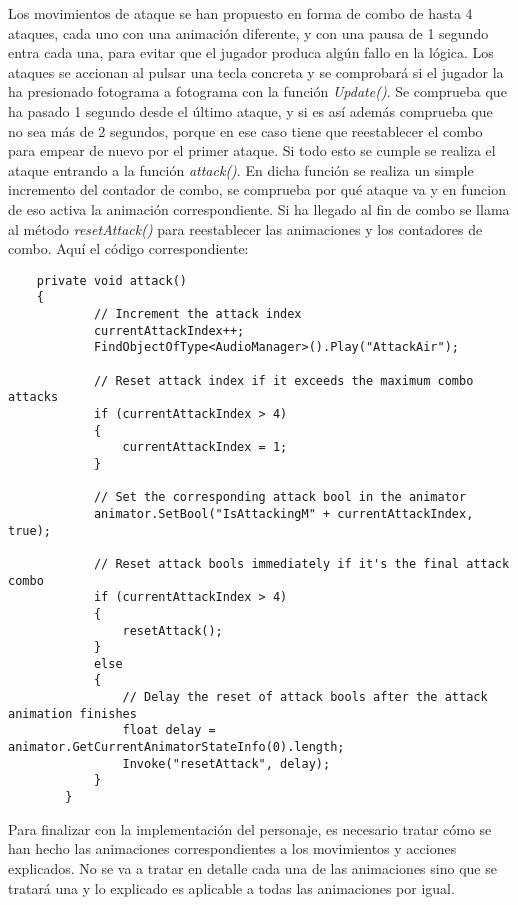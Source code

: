 Los movimientos de ataque se han propuesto en forma de combo de hasta 4 ataques, cada uno con una animación diferente, y con una pausa de 1 segundo entra cada una, para evitar que el jugador produca algún fallo en la lógica. Los ataques se accionan al pulsar una tecla concreta y se comprobará si el jugador la ha presionado fotograma a fotograma con la función \textit{Update()}. Se comprueba que ha pasado 1 segundo desde el último ataque, y si es así además comprueba que no sea más de 2 segundos, porque en ese caso tiene que reestablecer el combo para empear de nuevo por el primer ataque. Si todo esto se cumple se realiza el ataque entrando a la función \textit{attack()}. En dicha función se realiza un simple incremento del contador de combo, se comprueba por qué ataque va y en funcion de eso activa la animación correspondiente. Si ha llegado al fin de combo se llama al método \textit{resetAttack()} para reestablecer las animaciones y los contadores de combo. Aquí el código correspondiente:

\begin{lstlisting}
    private void attack()
    {
            // Increment the attack index
            currentAttackIndex++;
            FindObjectOfType<AudioManager>().Play("AttackAir");
    
            // Reset attack index if it exceeds the maximum combo attacks
            if (currentAttackIndex > 4)
            {
                currentAttackIndex = 1;
            }
    
            // Set the corresponding attack bool in the animator
            animator.SetBool("IsAttackingM" + currentAttackIndex, true);
    
            // Reset attack bools immediately if it's the final attack combo
            if (currentAttackIndex > 4)
            {
                resetAttack();
            }
            else
            {
                // Delay the reset of attack bools after the attack animation finishes
                float delay = animator.GetCurrentAnimatorStateInfo(0).length;
                Invoke("resetAttack", delay);
            }
        }
\end{lstlisting}

Para finalizar con la implementación del personaje, es necesario tratar cómo se han hecho las animaciones correspondientes a los movimientos y acciones explicados. No se va a tratar en detalle cada una de las animaciones sino que se tratará una y lo explicado es aplicable a todas las animaciones por igual.

